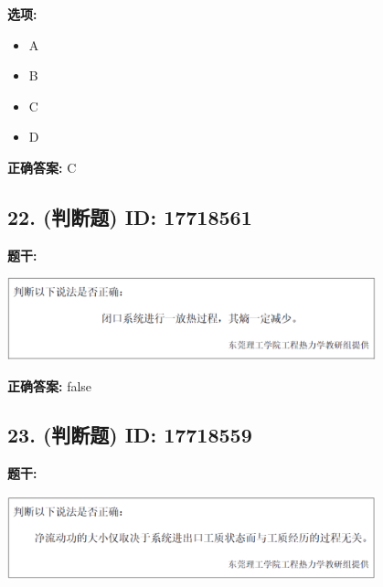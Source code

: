 \documentclass[12pt]{article}
\begin{document}
\textbf{选项:}
\begin{itemize}[leftmargin=*]
  \item A

  \item B

  \item C

  \item D

\end{itemize}

\textbf{正确答案:}
C

\vspace{0.5em}\hrulefill\vspace{1em}

\subsection*{22. (判断题) \small ID: 17718561}

\textbf{题干:}


\begin{center}\includegraphics[width=0.8\textwidth, height=0.25\textheight, keepaspectratio]{question_22_17718561/title_img_1.png}\end{center}

\textbf{正确答案:}
false

\vspace{0.5em}\hrulefill\vspace{1em}

\subsection*{23. (判断题) \small ID: 17718559}

\textbf{题干:}


\begin{center}\includegraphics[width=0.8\textwidth, height=0.25\textheight, keepaspectratio]{question_23_17718559/title_img_1.png}\end{center}
\end{document}
